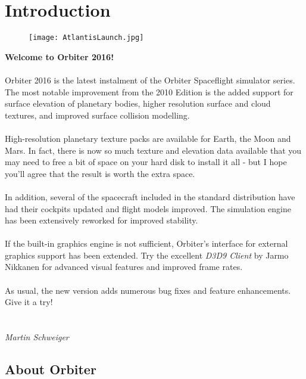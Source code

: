 \documentclass[Orbiter User Manual.tex]{subfiles}
\begin{document}
\section{Introduction}

\begin{figure}[H]
  \centering
  \texttt{[image: AtlantisLaunch.jpg]}
\end{figure}

\textbf{Welcome to Orbiter 2016!}\\
\\
Orbiter 2016 is the latest instalment of the Orbiter Spaceflight simulator series. The most notable improvement from the 2010 Edition is the added support for surface elevation of planetary bodies, higher resolution surface and cloud textures, and improved surface collision modelling.\\
\\
High-resolution planetary texture packs are available for Earth, the Moon and Mars. In fact, there is now so much texture and elevation data available that you may need to free a bit of space on your hard disk to install it all - but I hope you'll agree that the result is worth the extra space.\\
\\
In addition, several of the spacecraft included in the standard distribution have had their cockpits updated and flight models improved. The simulation engine has been extensively reworked for improved stability.\\
\\
If the built-in graphics engine is not sufficient, Orbiter's interface for external graphics support has been extended. Try the excellent \textit{D3D9 Client} by Jarmo Nikkanen for advanced visual features and improved frame rates.\\
\\
As usual, the new version adds numerous bug fixes and feature enhancements. Give it a try!\\
\\
\\
\textit{Martin Schweiger}



\subsection{About Orbiter}
\end{document}
